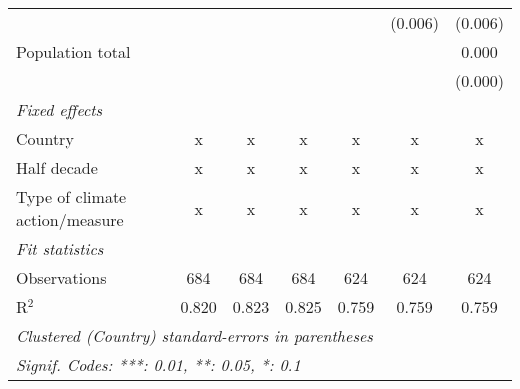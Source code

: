 \begin{tabular}{lcccccc}
                                                  &               &               &               &               & (0.006)       & (0.006)\\   
   Population total                               &               &               &               &               &               & 0.000\\   
                                                  &               &               &               &               &               & (0.000)\\   
   \emph{Fixed effects}\\
   Country                                        & x             & x             & x             & x             & x             & x\\  
   Half decade                                    & x             & x             & x             & x             & x             & x\\  
   Type of climate action/measure                 & x             & x             & x             & x             & x             & x\\  
   \midrule \emph{Fit statistics}\\
   Observations                                   & 684           & 684           & 684           & 624           & 624           & 624\\  
   R$^2$                                          & 0.820         & 0.823         & 0.825         & 0.759         & 0.759         & 0.759\\  
   \midrule
   \multicolumn{7}{l}{\emph{Clustered (Country) standard-errors in parentheses}}\\
   \multicolumn{7}{l}{\emph{Signif. Codes: ***: 0.01, **: 0.05, *: 0.1}}\\
\end{tabular}
\par\endgroup


